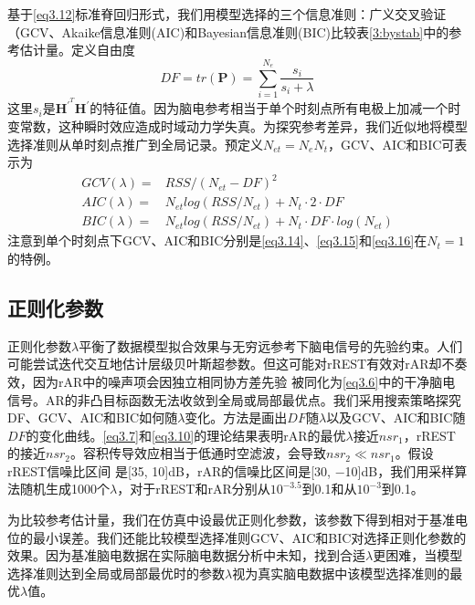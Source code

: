 基于\eqref{eq3.12}标准脊回归形式，我们用模型选择的三个信息准则：广义交叉验证（GCV、Akaike信息准则(AIC)和Bayesian信息准则(BIC)比较表\ref{3:bystab}中的参考估计量。定义自由度
\begin{equation}
DF=tr(\mathbf{P})=\sum_{i=1}^{N_{e}}\dfrac{s_i}{s_i+\lambda}
\end{equation}
这里$s_i$是$\mathbf{H}^{\prime^T}\mathbf{H}^\prime$的特征值。因为脑电参考相当于单个时刻点所有电极上加减一个时变常数，这种瞬时效应造成时域动力学失真。为探究参考差异，我们近似地将模型选择准则从单时刻点推广到全局记录。预定义$N_{et}=N_eN_t$，GCV、AIC和BIC可表示为
\begin{align}
GCV(\lambda)={} &RSS/(N_{et}-DF)^2\label{eq3.14}\\
AIC(\lambda)={} &N_{et}log(RSS/{N_{et}})+N_t\cdot{2}\cdot{DF}\label{eq3.15}\\
BIC(\lambda)={} &N_{et}log(RSS/{N_{et}})+N_t\cdot{DF}\cdot{log(N_{et})}\label{eq3.16}
\end{align}
注意到单个时刻点下GCV、AIC和BIC分别是\eqref{eq3.14}、\eqref{eq3.15}和\eqref{eq3.16}在$N_t=1$的特例。
\subsection{正则化参数}
正则化参数$\lambda$平衡了数据模型拟合效果与无穷远参考下脑电信号的先验约束。人们可能尝试迭代交互地估计层级贝叶斯超参数。但这可能对rREST有效对rAR却不奏效，因为rAR中的噪声项会因独立相同协方差先验
被同化为\eqref{eq3.6}中的干净脑电信号。AR的非凸目标函数无法收敛到全局或局部最优点。我们采用搜索策略探究DF、GCV、AIC和BIC如何随$\lambda$变化。方法是画出$DF$随$\lambda$以及GCV、AIC和BIC随$DF$的变化曲线。\eqref{eq3.7}和\eqref{eq3.10}的理论结果表明rAR的最优$\lambda$接近$nsr_1$，rREST的接近$nsr_2$。容积传导效应相当于低通时空滤波，会导致$nsr_2\ll{nsr_1}$。假设rREST信噪比区间
是[35, 10]dB，rAR的信噪比区间是[30, −10]dB，我们用采样算法随机生成1000个$\lambda$，对于rREST和rAR分别从$10^{-3.5}$到0.1和从$10^{-3}$到0.1。

为比较参考估计量，我们在仿真中设最优正则化参数，该参数下得到相对于基准电位的最小误差。我们还能比较模型选择准则GCV、AIC和BIC对选择正则化参数的效果。因为基准脑电数据在实际脑电数据分析中未知，找到合适$\lambda$更困难，当模型选择准则达到全局或局部最优时的参数$\lambda$视为真实脑电数据中该模型选择准则的最优$\lambda$值。

